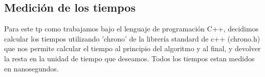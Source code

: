 \subsection{Medición de los tiempos}

Para este tp como trabajamos bajo el lenguaje de programación C++, decidimos calcular los tiempos utilizando 'chrono' de la librería standard de c++ (chrono.h) que nos permite calcular el tiempo al principio del algoritmo y al final, y devolver la resta en la unidad de tiempo que deseamos. Todos los tiempos estan medidos en nanosegundos.\\ \\


% 

% 

% 

